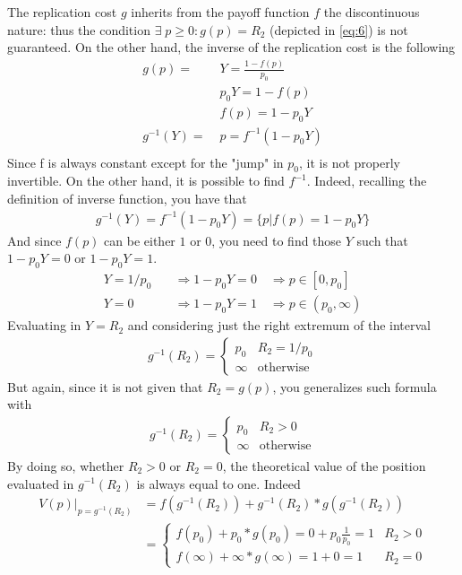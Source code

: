 \documentclass[12pt]{article}
\begin{document}
The replication cost $g$ inherits from the payoff function $f$ the discontinuous nature: thus the condition $\exists\; p\geq 0 : g(p)=R_2$ (depicted in \eqref{eq:6}) is not guaranteed.
On the other hand, the inverse of the replication cost is the following
\begin{align*}
    g(p) = \;      & Y = \frac{1-f(p)}{p_0} \\
                   & p_0Y = 1-f(p)          \\
                   & f(p) = 1-p_0Y          \\
    g^{-1}(Y) = \; & p = f^{-1}(1-p_0Y)     \\
\end{align*}
Since f is always constant except for the "jump" in $p_0$, it is not properly invertible. On the other hand, it is possible to find $f^{-1}$. Indeed, recalling the definition of inverse function, you have that
\begin{align*}
    g^{-1}(Y)=f^{-1}(1-p_0Y)=\{p| f(p)=1-p_0Y    \}
\end{align*}
And since $f(p)$ can be either $1$ or $0$, you need to find those $Y$ such that $1-p_0Y=0$ or $1-p_0Y=1$.
\begin{align*}
    Y=1/p_0 & \quad \Rightarrow 1-p_0Y=0  \quad \Rightarrow p\in[0,p_0]       \\
    Y=0     & \quad \Rightarrow 1-p_0Y=1  \quad \Rightarrow  p\in(p_0,\infty)
\end{align*}
Evaluating in $Y=R_2$ and considering just the right extremum of the interval
\begin{align*}
    g^{-1}(R_2) = \begin{cases}
                      p_0    & R_2= 1/p_0       \\
                      \infty & \text{otherwise}
                  \end{cases}
\end{align*}
But again, since it is not given that $R_2 = g(p)$, you generalizes such formula with
\begin{align*}
    g^{-1}(R_2) = \begin{cases}
                      p_0    & R_2>0            \\
                      \infty & \text{otherwise}
                  \end{cases}
\end{align*}
By doing so, whether $R_2>0$ or $R_2=0$, the theoretical value of the position evaluated in $g^{-1}(R_2)$ is always equal to one. Indeed
\begin{align*}
    V(p)|_{p=g^{-1}(R_2)} & =f(g^{-1}(R_2))+g^{-1}(R_2)*g(g^{-1}(R_2))      \\
                          & =\begin{cases}
                                 f(p_0)+p_0*g(p_0)=0+p_0\frac{1}{p_0}=1 & R_2>0 \\
                                 f(\infty)+\infty*g(\infty)=1+0=1       & R_2=0
                             \end{cases}
\end{align*}
\end{document}
